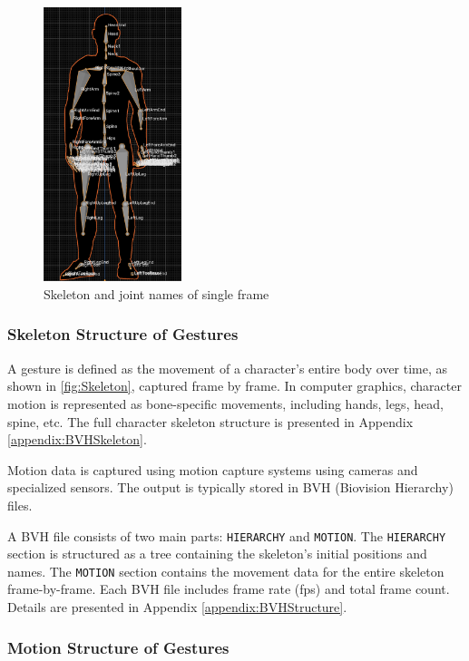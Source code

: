 \begin{figure}[h]
	\centering
	\includegraphics[height=8cm]{figures/Skeleton.png}
	\caption{\small Skeleton and joint names of single frame}
	\label{fig:Skeleton}
\end{figure}

\subsubsection{Skeleton Structure of Gestures}

A gesture is defined as the movement of a character's entire body over time, as shown in \autoref{fig:Skeleton}, captured frame by frame. In computer graphics, character motion is represented as bone-specific movements, including hands, legs, head, spine, etc. The full character skeleton structure is presented in Appendix \autoref{appendix:BVHSkeleton}.

Motion data is captured using motion capture systems using cameras and specialized sensors. The output is typically stored in BVH (Biovision Hierarchy) files.

A BVH file consists of two main parts: \texttt{HIERARCHY} and \texttt{MOTION}. The \texttt{HIERARCHY} section is structured as a tree containing the skeleton’s initial positions and names. The \texttt{MOTION} section contains the movement data for the entire skeleton frame-by-frame. Each BVH file includes frame rate (fps) and total frame count. Details are presented in Appendix \autoref{appendix:BVHStructure}.

\subsubsection{Motion Structure of Gestures}

